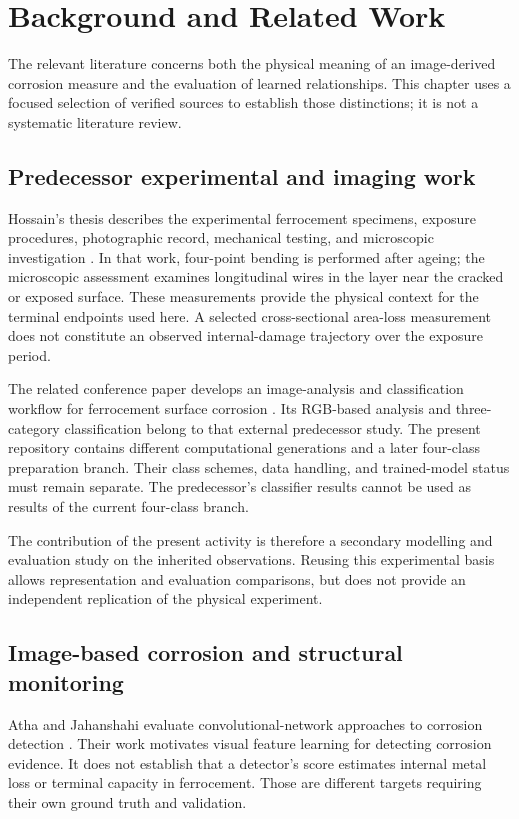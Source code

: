 \chapter{Background and Related Work}\label{ch:background}
The relevant literature concerns both the physical meaning of an image-derived corrosion measure and the evaluation of learned relationships. This chapter uses a focused selection of verified sources to establish those distinctions; it is not a systematic literature review.

\section{Predecessor experimental and imaging work}
Hossain's thesis describes the experimental ferrocement specimens, exposure procedures, photographic record, mechanical testing, and microscopic investigation \citep{hossain_thesis}. In that work, four-point bending is performed after ageing; the microscopic assessment examines longitudinal wires in the layer near the cracked or exposed surface. These measurements provide the physical context for the terminal endpoints used here. A selected cross-sectional area-loss measurement does not constitute an observed internal-damage trajectory over the exposure period.

The related conference paper develops an image-analysis and classification workflow for ferrocement surface corrosion \citep{artiste2025}. Its RGB-based analysis and three-category classification belong to that external predecessor study. The present repository contains different computational generations and a later four-class preparation branch. Their class schemes, data handling, and trained-model status must remain separate. The predecessor's classifier results cannot be used as results of the current four-class branch.

The contribution of the present activity is therefore a secondary modelling and evaluation study on the inherited observations. Reusing this experimental basis allows representation and evaluation comparisons, but does not provide an independent replication of the physical experiment.

\section{Image-based corrosion and structural monitoring}
Atha and Jahanshahi evaluate convolutional-network approaches to corrosion detection \citep{atha2018}. Their work motivates visual feature learning for detecting corrosion evidence. It does not establish that a detector's score estimates internal metal loss or terminal capacity in ferrocement. Those are different targets requiring their own ground truth and validation.


